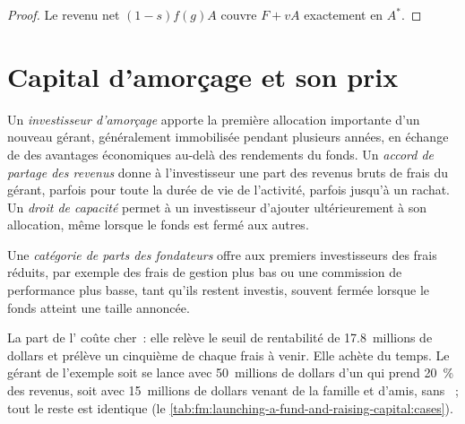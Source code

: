 \begin{proof}
Le revenu net $(1-s)f(g)A$ couvre $F+vA$ exactement en $A^*$.
\end{proof}

\label{lst:fm:launching-a-fund-and-raising-capital:model}

\section{Capital d'amorçage et son prix}

\begin{definition}\label{def:fm:launching-a-fund-and-raising-capital:seed}
Un \emph{investisseur d'amorçage} apporte la première allocation importante d'un nouveau gérant, généralement immobilisée pendant plusieurs années, en échange de
des avantages économiques au-delà des rendements du fonds. Un \emph{accord de partage des revenus} donne à l'investisseur une part des revenus bruts
de frais du gérant, parfois pour toute la durée de vie de l'activité, parfois jusqu'à un rachat. Un \emph{droit de capacité} permet à un
investisseur d'ajouter ultérieurement à son allocation, même lorsque le fonds est fermé aux autres.
\end{definition}

\begin{definition}\label{def:fm:launching-a-fund-and-raising-capital:founders}
Une \emph{catégorie de parts des fondateurs} offre aux premiers investisseurs des frais réduits, par exemple des frais de gestion plus bas ou
une commission de performance plus basse, tant qu'ils restent investis, souvent fermée lorsque le fonds atteint une taille annoncée.
\end{definition}

La part de l' coûte cher~: elle relève le seuil de rentabilité de 17.8~millions de dollars et prélève un cinquième de chaque frais à venir. Elle achète du temps. Le gérant de l'exemple
soit se lance avec 50~millions de dollars d'un  qui prend 20~\% des revenus, soit avec 15~millions de dollars venant de la famille et d'amis, sans ~; tout le reste
est identique (le \cref{tab:fm:launching-a-fund-and-raising-capital:cases}).

